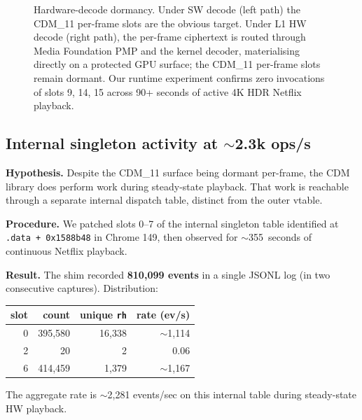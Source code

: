 \documentclass[11pt,letterpaper]{article}
\begin{document}
\begin{figure}[t]
\caption{Hardware-decode dormancy.  Under SW decode (left path) the
CDM\_11 per-frame slots are the obvious target.  Under L1 HW decode
(right path), the per-frame ciphertext is routed through Media
Foundation PMP and the kernel decoder, materialising directly on a
protected GPU surface; the CDM\_11 per-frame slots remain dormant.
Our runtime experiment confirms zero invocations of slots 9, 14, 15
across 90+ seconds of active 4K HDR Netflix playback.}
\label{fig:hwdormancy}
\end{figure}

\subsection{Internal singleton activity at $\sim$2.3k ops/s}
\label{sec:findings-singleton}

\textbf{Hypothesis.}  Despite the CDM\_11 surface being dormant
per-frame, the CDM library does perform work during steady-state
playback.  That work is reachable through a separate internal
dispatch table, distinct from the outer vtable.

\textbf{Procedure.}  We patched slots 0--7 of the internal singleton
table identified at \texttt{.data + 0x1588b48} in Chrome 149, then
observed for $\sim$355~seconds of continuous Netflix playback.

\textbf{Result.}  The shim recorded \textbf{810{,}099 events} in a
single JSONL log (in two consecutive captures).
Distribution:

\begin{center}\small
\begin{tabular}{rrrr}
\toprule
\textbf{slot} & \textbf{count} & \textbf{unique \texttt{rh}} & \textbf{rate (ev/s)} \\
\midrule
0 & 395{,}580 & 16{,}338 & $\sim$1{,}114 \\
2 &     20    &  2     & 0.06 \\
6 & 414{,}459 & 1{,}379 & $\sim$1{,}167 \\
\bottomrule
\end{tabular}
\end{center}

\noindent The aggregate rate is $\sim$2{,}281 events/sec on this
internal table during steady-state HW playback.
\end{document}
